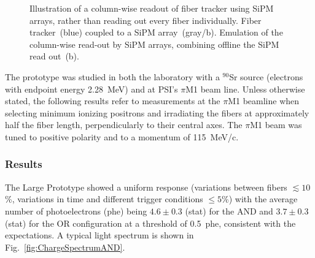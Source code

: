 \begin{refsection}
        \begin{figure}
            \centering
            \hspace{0.2\columnwidth}
            \caption[Fiber tracker read-out column-wise by SiPM arrays ]{Illustration of a column-wise readout of fiber tracker using SiPM arrays, rather than reading out every fiber individually. Fiber tracker~(blue) coupled to a SiPM array~(gray/b). Emulation of the column-wise read-out by SiPM arrays, combining offline the SiPM read out~(b).}
            \label{fig:sipmarray}
        \end{figure}

        \noindent
        The prototype was studied in both the laboratory with a $^{90}$Sr source (electrons with endpoint energy \SI{2.28}{MeV}) and at PSI's $\pi$M1 beam line. 
        Unless otherwise stated, the following results refer to measurements at the $\pi$M1 beamline when selecting minimum ionizing positrons and irradiating the fibers at approximately half the fiber length, perpendicularly to their central axes. 
        The $\pi$M1 beam was tuned to positive polarity and to a momentum of \SI{115}{MeV/c}.\\ 

        \subsubsection{Results}
        The Large Prototype showed a uniform response (variations between fibers $\lesssim10$\thinspace\%, variations in time and different trigger conditions $\leq 5$\thinspace\%) with the average number of photoelectrons (phe) being $4.6\pm0.3$ (stat) for the AND and $3.7\pm0.3$ (stat) for the OR configuration at a threshold of 0.5~phe, consistent with the expectations. A typical light spectrum is shown in Fig.~\ref{fig:ChargeSpectrumAND}.\\
        

\end{refsection}
